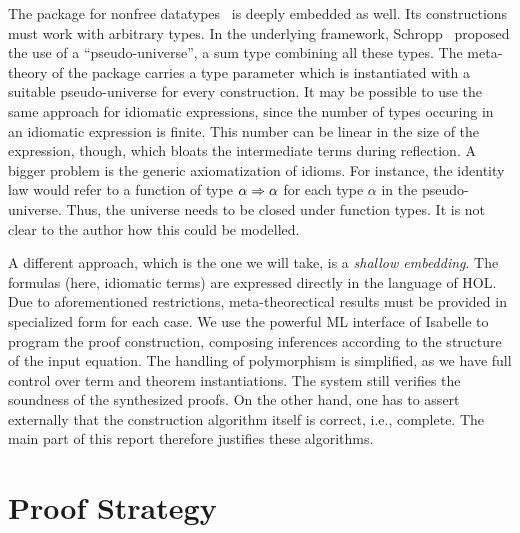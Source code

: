 The package for nonfree datatypes~\cite{schropp13} is deeply embedded as well.
Its constructions must work with arbitrary types.
In the underlying framework, Schropp~\cite{schropp12} proposed the use of a
``pseudo-universe'', a sum type combining all these types.
The meta-theory of the package carries a type parameter which is instantiated
with a suitable pseudo-universe for every construction.
It may be possible to use the same approach for idiomatic expressions, since the
number of types occuring in an idiomatic expression is finite.
This number can be linear in the size of the expression, though, which bloats
the intermediate terms during reflection.
A bigger problem is the generic axiomatization of idioms.
For instance, the identity law would refer to a function of type $\alpha \Rightarrow \alpha$
for each type $\alpha$ in the pseudo-universe.
Thus, the universe needs to be closed under function types.
It is not clear to the author how this could be modelled.

A different approach, which is the one we will take, is a \emph{shallow embedding}.
The formulas (here, idiomatic terms) are expressed directly in the language of HOL.
Due to aforementioned restrictions, meta-theorectical results must be provided
in specialized form for each case.
We use the powerful ML interface of Isabelle to program the proof construction,
composing inferences according to the structure of the input equation.
The handling of polymorphism is simplified, as we have full control over
term and theorem instantiations.
The system still verifies the soundness of the synthesized proofs.
On the other hand, one has to assert externally that the construction algorithm
itself is correct, i.e., complete.
The main part of this report therefore justifies these algorithms.


\section{Proof Strategy}\label{subsec:proof-strategy}

